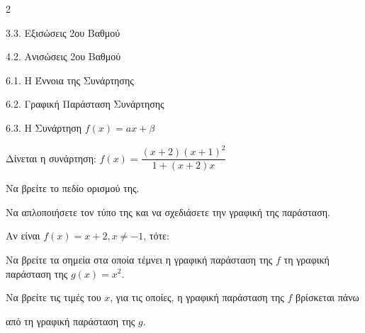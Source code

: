 \begin{ylh}{2}
    \item 3.3. Εξισώσεις 2ου Βαθμού
    \item 4.2. Ανισώσεις 2ου Βαθμού
    \item 6.1. Η Έννοια της Συνάρτησης
    \item 6.2. Γραφική Παράσταση Συνάρτησης
    \item 6.3. Η Συνάρτηση $f(x)=ax+\beta$
\end{ylh}
Δίνεται η συνάρτηση: $f(x) = \dfrac{(x+2)(x+1)^2}{1+(x+2)x}$
\begin{alist}
\item Να βρείτε το πεδίο ορισμού της.
\item Να απλοποιήσετε τον τύπο της και να σχεδιάσετε την γραφική της παράσταση.

\item Αν είναι $f(x) = x+2, x \neq -1$, τότε:
\begin{rlist}
\item Να βρείτε τα σημεία στα οποία τέμνει η γραφική παράσταση της $f$ τη γραφική παράσταση της $g(x) = x^2$.
\item Να βρείτε τις τιμές του $x$, για τις οποίες, η γραφική παράσταση της $f$ βρίσκεται πάνω

από τη γραφική παράσταση της $g$.
\end{rlist}
\end{alist}

